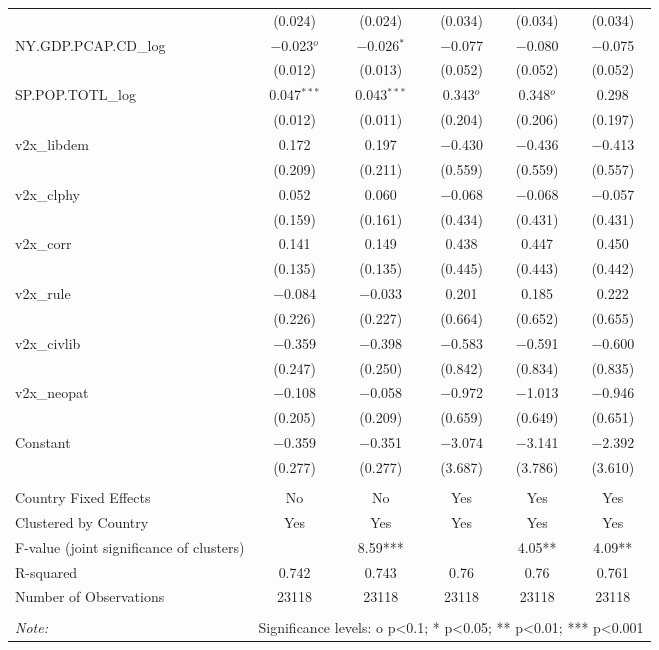 \documentclass{article}
\begin{document}
\begin{table}[htbp]
{\begin{tabular}{@{\extracolsep{5pt}}lccccc}
  & (0.024) & (0.024) & (0.034) & (0.034) & (0.034) \\ 
  NY.GDP.PCAP.CD\_log & $-$0.023$^{o}$ & $-$0.026$^{*}$ & $-$0.077 & $-$0.080 & $-$0.075 \\ 
  & (0.012) & (0.013) & (0.052) & (0.052) & (0.052) \\ 
  SP.POP.TOTL\_log & 0.047$^{***}$ & 0.043$^{***}$ & 0.343$^{o}$ & 0.348$^{o}$ & 0.298 \\ 
  & (0.012) & (0.011) & (0.204) & (0.206) & (0.197) \\ 
  v2x\_libdem & 0.172 & 0.197 & $-$0.430 & $-$0.436 & $-$0.413 \\ 
  & (0.209) & (0.211) & (0.559) & (0.559) & (0.557) \\ 
  v2x\_clphy & 0.052 & 0.060 & $-$0.068 & $-$0.068 & $-$0.057 \\ 
  & (0.159) & (0.161) & (0.434) & (0.431) & (0.431) \\ 
  v2x\_corr & 0.141 & 0.149 & 0.438 & 0.447 & 0.450 \\ 
  & (0.135) & (0.135) & (0.445) & (0.443) & (0.442) \\ 
  v2x\_rule & $-$0.084 & $-$0.033 & 0.201 & 0.185 & 0.222 \\ 
  & (0.226) & (0.227) & (0.664) & (0.652) & (0.655) \\ 
  v2x\_civlib & $-$0.359 & $-$0.398 & $-$0.583 & $-$0.591 & $-$0.600 \\ 
  & (0.247) & (0.250) & (0.842) & (0.834) & (0.835) \\ 
  v2x\_neopat & $-$0.108 & $-$0.058 & $-$0.972 & $-$1.013 & $-$0.946 \\ 
  & (0.205) & (0.209) & (0.659) & (0.649) & (0.651) \\ 
  Constant & $-$0.359 & $-$0.351 & $-$3.074 & $-$3.141 & $-$2.392 \\ 
  & (0.277) & (0.277) & (3.687) & (3.786) & (3.610) \\ 
 \hline \\[-1.8ex] 
Country Fixed Effects & No & No & Yes & Yes & Yes \\ 
Clustered by Country & Yes & Yes & Yes & Yes & Yes \\ 
F-value (joint significance of clusters) &  & 8.59*** &  & 4.05** & 4.09** \\ 
R-squared & 0.742 & 0.743 & 0.76 & 0.76 & 0.761 \\ 
Number of Observations & 23118 & 23118 & 23118 & 23118 & 23118 \\ 
\hline 
\hline \\[-1.8ex] 
\textit{Note:}  & \multicolumn{5}{l}{Significance levels: o p<0.1; * p<0.05; ** p<0.01; *** p<0.001} \\ 
\end{tabular} 
}

\end{table}
\end{document}
